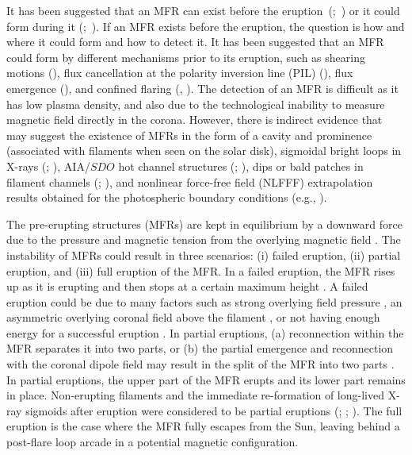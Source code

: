 \documentclass{aastex62}
\begin{document}
It has been suggested that an MFR can exist before the eruption~(\citealt{van_Ballegooijen_etal_1989};~\citealt{Chen_etal_1997})  or it could form during it (\citealt{Antiochos_etal_1999};~\citealt{Lynch_etal_2008}). If an MFR exists before the eruption, the question is how and where it could form and how to detect it. It has been suggested that an MFR could form by different mechanisms prior to its eruption, such as shearing motions (\citealt{Amari_etal_2000,Amari_etal_I_2003, Jacobs_etal_2009}), flux cancellation at the polarity inversion line (PIL) (\citealt{van_Ballegooijen_etal_1989, Aulanier_etal_2010, Green_etal_2011}), flux emergence (\citealt{Fan_and_Gibson_2003, Leake_etal_I_2013}), and confined flaring (\citealt{Patsourakos_etal_2013}, \citealt{Chintzoglou_etal_2015}). The detection of an MFR is difficult as it has low plasma density, and also due to the technological inability to measure magnetic field directly in the corona. However, there is indirect evidence that may suggest the existence of MFRs in the form of a cavity and prominence (associated with filaments when seen on the solar disk), sigmoidal bright loops in X-rays (\citealt{Rust_and_Kumar_1996}; \citealt{Green_etal_2007}), AIA/$\textit{SDO}$ hot channel structures (\citealt{Cheng_etal_2011}; \citealt{Zhang_etal_2012}), dips or bald patches in filament channels (\citealt{Lites_etal_2005}; \citealt{Lopez_Ariste_etal_2006}), and nonlinear force-free field (NLFFF) extrapolation results obtained for the photospheric boundary conditions (e.g., \citealt{Chintzoglou_etal_2015}). 

The pre-erupting structures (MFRs) are kept in equilibrium by a downward force due to the pressure and magnetic tension from the overlying magnetic field \citep{Chen_1989}.
The instability of MFRs could result in three scenarios: (i) failed eruption, (ii) partial eruption, and (iii) full eruption of the MFR. In a failed eruption, the MFR rises up as it is erupting and then stops at a certain maximum height \citep{Song_etal_2014}. A failed eruption could be due to many factors such as strong overlying field pressure \citep{Sun_etal_2015}, an asymmetric overlying coronal field above the filament \citep{Liu_etal_2009}, or not having enough energy for a successful eruption \citep{Shen_etal_2011}. In partial eruptions, (a) reconnection within the MFR \citep{Gibson_and_Fan_2006} separates it into two parts, or (b) the partial emergence and reconnection with the coronal dipole field may result in the split of the MFR into two parts  \citep{Leake_etal_II_2014}. In partial eruptions, the upper part of the MFR erupts and its lower part remains in place. Non-erupting filaments and the immediate re-formation of long-lived X-ray sigmoids after eruption were considered to be partial eruptions (\citealt{Tang_1986}; \citealt{Gilbert_etal_2000}; \citealt{Gibson_etal_2002}). The full eruption is the case where the MFR fully escapes from the Sun, leaving behind a post-flare loop arcade in a potential magnetic configuration.
\end{document}
